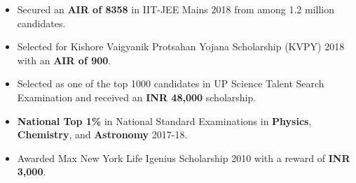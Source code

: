 
\begin{itemize}
  \item Secured an \textbf{AIR of 8358} in IIT-JEE Mains 2018 from among 1.2 million candidates.
  \item Selected for Kishore Vaigyanik Protsahan Yojana Scholarship (KVPY) 2018 with an \textbf{AIR of 900}.
  \item Selected as one of the top 1000 candidates in UP Science Talent Search Examination and received an \textbf{INR 48,000} scholarship.
  \item \textbf{National Top 1\%} in National Standard Examinations in \textbf{Physics}, \textbf{Chemistry}, and \textbf{Astronomy} 2017-18.
  \item Awarded Max New York Life Igenius Scholarship 2010 with a reward of \textbf{INR 3,000}.
\end{itemize}
